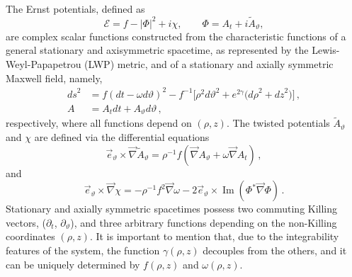 \documentclass[aps,preprint,groupedaddress,nofootinbib,superscriptaddress,showkeys,showpacs,eqsecnum,amsmath,amssymb]{revtex4-1}
\newcommand{\ernst}{\mathcal{E}}
\renewcommand\Im{\operatorname{Im}}
\begin{document}
The Ernst potentials, defined as
\begin{equation}
\ernst = f - |\Phi|^2 + i \chi , \qquad
\Phi = A_t + i\tilde{A}_\vartheta ,
\end{equation}
are complex scalar functions constructed from the characteristic functions of a general stationary and axisymmetric spacetime, as represented by the Lewis-Weyl-Papapetrou (LWP) metric, and of a stationary and axially symmetric Maxwell field, namely,
\begin{subequations}
\label{lwp-e}
\begin{align}
{ds}^2 & =  f ( dt - \omega d\vartheta )^2 - f^{-1} \bigl[ \rho^2 {d\vartheta}^2 + e^{2\gamma}  \bigl( {d \rho}^2 + {d z}^2 \bigr) \bigr] \,, \\
A & = A_t dt + A_\vartheta d\vartheta \,,
\end{align}
\end{subequations}
respectively, where all functions depend on $(\rho,z)$. The twisted potentials $\tilde{A}_\vartheta$ and $\chi$ are defined via the differential equations 
\begin{equation}
\vec{e}_\vartheta \times \vec\nabla \tilde{A}_\vartheta =
\rho^{-1} f \left( \vec{\nabla} A_\vartheta + \omega \vec{\nabla} A_t \right) \,,
\end{equation}
and
\begin{equation}
\label{chi}
\vec{e}_{\vartheta} \times \vec{\nabla}\chi =
-\rho^{-1} f^2 \vec{\nabla}\omega -2 \vec{e}_{\vartheta} \times \Im\left( \Phi^* \vec\nabla\Phi \right) \,.
\end{equation}
Stationary and axially symmetric spacetimes possess two commuting Killing vectors, ($\partial_t$, $\partial_\vartheta$), and three arbitrary functions depending on the non-Killing coordinates $(\rho,z)$. It is important to mention that, due to the integrability features of the system, the function $\gamma(\rho,z)$ decouples from the others, and it can be uniquely determined by $f(\rho,z)$ and $\omega(\rho,z)$. 
\end{document}
